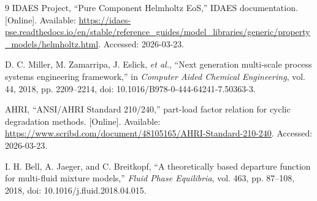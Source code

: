 \documentclass[11pt]{article}
\begin{document}
\begin{thebibliography}{9}
IDAES Project, ``Pure Component Helmholtz EoS,'' IDAES documentation. [Online]. Available: \url{https://idaes-pse.readthedocs.io/en/stable/reference_guides/model_libraries/generic/property_models/helmholtz.html}. Accessed: 2026-03-23.

D. C. Miller, M. Zamarripa, J. Eslick, \emph{et al.}, ``Next generation multi-scale process systems engineering framework,'' in \emph{Computer Aided Chemical Engineering}, vol. 44, 2018, pp. 2209--2214, doi: 10.1016/B978-0-444-64241-7.50363-3.

AHRI, ``ANSI/AHRI Standard 210/240,'' part-load factor relation for cyclic degradation methods. [Online]. Available: \url{https://www.scribd.com/document/48105165/AHRI-Standard-210-240}. Accessed: 2026-03-23.

I. H. Bell, A. Jaeger, and C. Breitkopf, ``A theoretically based departure function for multi-fluid mixture models,'' \emph{Fluid Phase Equilibria}, vol. 463, pp. 87--108, 2018, doi: 10.1016/j.fluid.2018.04.015.
\end{thebibliography}
\end{document}
